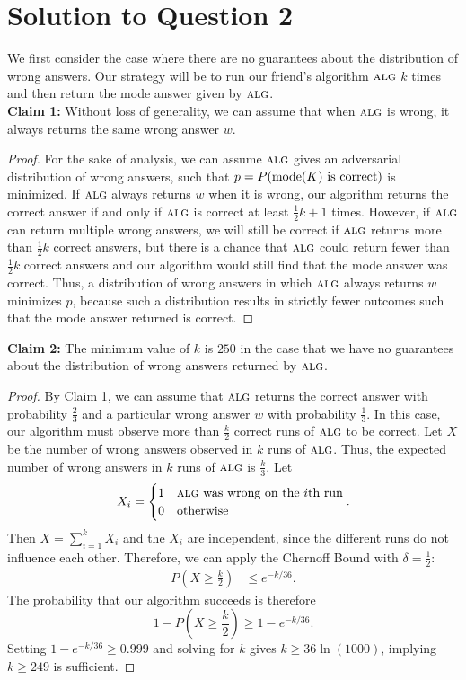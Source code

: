 \documentclass[11pt]{article}
\newcommand{\alg}{\textsc{alg}}
\begin{document}
\newpage

\section{Solution to Question 2}
We first consider the case where there are no guarantees about the distribution of wrong answers.
Our strategy will be to run our friend's algorithm $\alg$ $k$ times and then return the mode answer given by $\alg$.\\

\noindent \textbf{Claim 1:} Without loss of generality, we can assume that when $\alg$ is wrong, it always returns the same wrong answer $w$.

\begin{proof}
  For the sake of analysis, we can assume $\alg$ gives an adversarial distribution of wrong answers, such that $p = P(\operatorname{mode}(K) \textnormal{ is correct})$ is minimized.
  If $\alg$ always returns $w$ when it is wrong, our algorithm returns the correct answer if and only if $\alg$ is correct at least $\frac{1}{2} k + 1$ times.
  However, if $\alg$ can return multiple wrong answers, we will still be correct if $\alg$ returns more than $\frac{1}{2}k$ correct answers, but there is a chance that $\alg$ could return fewer than $\frac{1}{2}k$ correct answers and our algorithm would still find that the mode answer was correct.
  Thus, a distribution of wrong answers in which $\alg$ always returns $w$ minimizes $p$, because such a distribution results in strictly fewer outcomes such that the mode answer returned is correct.
\end{proof}

\noindent \textbf{Claim 2:} The minimum value of $k$ is $250$ in the case that we have no guarantees about the distribution of wrong answers returned by $\alg$.

\begin{proof}
  By Claim 1, we can assume that $\alg$ returns the correct answer with probability $\frac{2}{3}$ and a particular wrong answer $w$ with probability $\frac{1}{3}$.
  In this case, our algorithm must observe more than $\frac{k}{2}$ correct runs of $\alg$ to be correct.
  Let $X$ be the number of wrong answers observed in $k$ runs of $\alg$.
  Thus, the expected number of wrong answers in $k$ runs of $\alg$ is $\frac{k}{3}$.
  Let \[X_i = \begin{cases}1 & \alg \textnormal{ was wrong on the $i$th run}\\ 0 & \textnormal{otherwise}\end{cases}.\]
  Then $X = \sum_{i = 1}^{k} X_i$ and the $X_i$ are independent, since the different runs do not influence each other.
  Therefore, we can apply the Chernoff Bound with $\delta = \frac{1}{2}$:
  \begin{align*}
    P\left(X \geq \frac{k}{2}\right) &\leq e^{-k/36}.
  \end{align*}
  The probability that our algorithm succeeds is therefore \[1 - P\left(X \geq \frac{k}{2}\right) \geq 1 - e^{-k/36}.\]
  Setting $1 - e^{-k/36} \geq 0.999$ and solving for $k$ gives $k \geq 36\ln(1000)$, implying $k \geq 249$ is sufficient.
\end{proof}
\end{document}
